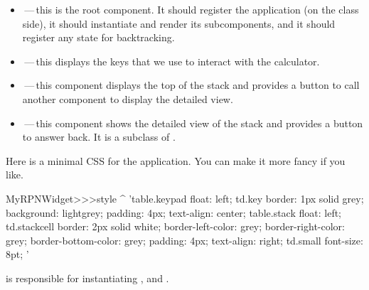 \documentclass[a4paper,10pt,twoside]{book}
\begin{document}
{{\begin{itemize}
    \item {}\,---\,this is the root component.
  It should register the application (on the class side), it should instantiate and render its subcomponents, and it should register any state for backtracking.
  \item {}\,---\,this displays the keys that we use to interact with the calculator.
  \item {}\,---\,this component displays the top of the stack and provides a button to call another component to display the detailed view.
  \item {}\,---\,this component shows the detailed view of the stack and provides a button to answer back.
  It is a subclass of .
\end{itemize}


Here is a minimal CSS for the application.
You can make it more fancy if you like.
\begin{code}{}
MyRPNWidget>>>style
	^ 'table.keypad { float: left; }
td.key {
	border: 1px solid grey;
	background: lightgrey;
	padding: 4px;
	text-align: center;
}
table.stack { float: left; }
td.stackcell {
	border: 2px solid white;
	border-left-color: grey;
	border-right-color: grey;
	border-bottom-color: grey;
	padding: 4px;
	text-align: right;
}
td.small { font-size: 8pt; }'
\end{code}


 is responsible for instantiating ,  and .


}}
\end{document}
